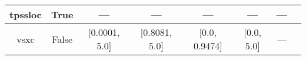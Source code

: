 \begin{tabular}{|c|c|c|c|c|c|c|l|}
      tpssloc &                  True &              --- &              --- &           --- &            --- &        --- &                                                       \cite{Constantin2012_035130} \\ \hline
         vsxc &                 False &    [0.0001, 5.0] &    [0.8081, 5.0] & [0.0, 0.9474] &     [0.0, 5.0] &        --- &                                                          \cite{VanVoorhis1998_400} \\ \hline
\end{tabular}
